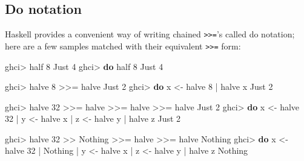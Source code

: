 \documentclass[]{article}
\newenvironment{Shaded}{}{}
\newcommand{\DataTypeTok}[1]{\textcolor[rgb]{0.56,0.13,0.00}{#1}}
\newcommand{\DecValTok}[1]{\textcolor[rgb]{0.25,0.63,0.44}{#1}}
\newcommand{\KeywordTok}[1]{\textcolor[rgb]{0.00,0.44,0.13}{\textbf{#1}}}
\newcommand{\NormalTok}[1]{#1}
\newcommand{\OperatorTok}[1]{\textcolor[rgb]{0.40,0.40,0.40}{#1}}
\newcommand{\OtherTok}[1]{\textcolor[rgb]{0.00,0.44,0.13}{#1}}
\begin{document}
\subsection{Do notation}\label{do-notation}

Haskell provides a convenient way of writing chained
\texttt{\textgreater{}\textgreater{}=}'s called do notation; here are a few
samples matched with their equivalent \texttt{\textgreater{}\textgreater{}=}
form:

\begin{Shaded}
\begin{Highlighting}[]
\NormalTok{ghci}\OperatorTok{\textgreater{}}\NormalTok{ half }\DecValTok{8}
\DataTypeTok{Just} \DecValTok{4}
\NormalTok{ghci}\OperatorTok{\textgreater{}} \KeywordTok{do}\NormalTok{  half }\DecValTok{8}
\DataTypeTok{Just} \DecValTok{4}

\NormalTok{ghci}\OperatorTok{\textgreater{}}\NormalTok{ halve }\DecValTok{8} \OperatorTok{\textgreater{}\textgreater{}=}\NormalTok{ halve}
\DataTypeTok{Just} \DecValTok{2}
\NormalTok{ghci}\OperatorTok{\textgreater{}} \KeywordTok{do}\NormalTok{  x }\OtherTok{\textless{}{-}}\NormalTok{ halve }\DecValTok{8}
    \OperatorTok{|}\NormalTok{     halve x}
\DataTypeTok{Just} \DecValTok{2}

\NormalTok{ghci}\OperatorTok{\textgreater{}}\NormalTok{ halve }\DecValTok{32} \OperatorTok{\textgreater{}\textgreater{}=}\NormalTok{ halve }\OperatorTok{\textgreater{}\textgreater{}=}\NormalTok{ halve }\OperatorTok{\textgreater{}\textgreater{}=}\NormalTok{ halve}
\DataTypeTok{Just} \DecValTok{2}
\NormalTok{ghci}\OperatorTok{\textgreater{}} \KeywordTok{do}\NormalTok{  x }\OtherTok{\textless{}{-}}\NormalTok{ halve }\DecValTok{32}
    \OperatorTok{|}\NormalTok{     y }\OtherTok{\textless{}{-}}\NormalTok{ halve x}
    \OperatorTok{|}\NormalTok{     z }\OtherTok{\textless{}{-}}\NormalTok{ halve y}
    \OperatorTok{|}\NormalTok{     halve z}
\DataTypeTok{Just} \DecValTok{2}

\NormalTok{ghci}\OperatorTok{\textgreater{}}\NormalTok{ halve }\DecValTok{32} \OperatorTok{\textgreater{}\textgreater{}} \DataTypeTok{Nothing} \OperatorTok{\textgreater{}\textgreater{}=}\NormalTok{ halve }\OperatorTok{\textgreater{}\textgreater{}=}\NormalTok{ halve}
\DataTypeTok{Nothing}
\NormalTok{ghci}\OperatorTok{\textgreater{}} \KeywordTok{do}\NormalTok{  x }\OtherTok{\textless{}{-}}\NormalTok{ halve }\DecValTok{32}
    \OperatorTok{|}     \DataTypeTok{Nothing}
    \OperatorTok{|}\NormalTok{     y }\OtherTok{\textless{}{-}}\NormalTok{ halve x}
    \OperatorTok{|}\NormalTok{     z }\OtherTok{\textless{}{-}}\NormalTok{ halve y}
    \OperatorTok{|}\NormalTok{     halve z}
\DataTypeTok{Nothing}
\end{Highlighting}
\end{Shaded}
\end{document}
